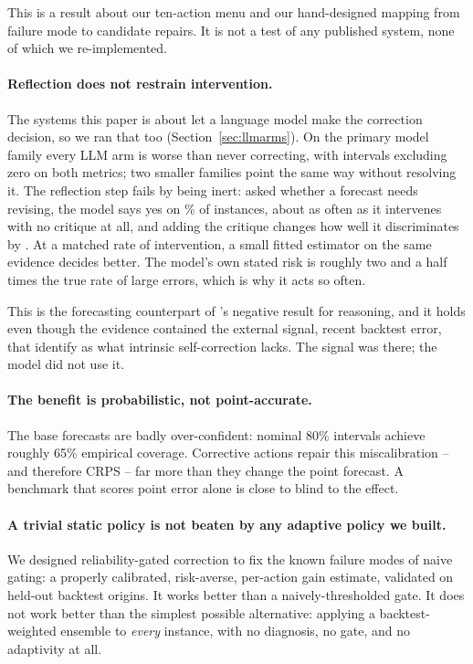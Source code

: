 This is a result about our ten-action menu and our hand-designed mapping from failure
mode to candidate repairs. It is not a test of any published system, none of which we
re-implemented.

\paragraph{Reflection does not restrain intervention.}
The systems this paper is about let a language model make the correction decision, so
we ran that too (Section~\ref{sec:llmarms}). On the primary model family every LLM
arm is worse than never correcting, with intervals excluding zero on both metrics; two
smaller families point the same way without resolving it. The reflection step fails by
being inert: asked whether a forecast needs revising, the model says yes on
\rateLlmCritiqueGate\% of instances, about as often as it intervenes with no
critique at all, and adding the critique changes how well it discriminates by
\discrimAurocDelta{}. At a matched rate of intervention, a small fitted estimator on the
same evidence decides better. The model's own stated risk is roughly two and a half
times the true rate of large errors, which is why it acts so often.

This is the forecasting counterpart of \citeauthor{huang2024selfcorrect}'s negative
result for reasoning, and it holds even though the evidence contained the external
signal, recent backtest error, that \citet{kamoi2024selfcorrect} identify as what
intrinsic self-correction lacks. The signal was there; the model did not use it.

\paragraph{The benefit is probabilistic, not point-accurate.}
The base forecasts are badly over-confident: nominal 80\% intervals achieve roughly 65\%
empirical coverage. Corrective actions repair this miscalibration -- and therefore CRPS
-- far more than they change the point forecast. A benchmark that scores point error
alone is close to blind to the effect.

\paragraph{A trivial static policy is not beaten by any adaptive policy we built.}
We designed reliability-gated correction to fix the known failure modes of naive
gating: a properly calibrated, risk-averse, per-action gain estimate, validated on
held-out backtest origins. It works better than a naively-thresholded gate. It does not
work better than the simplest possible alternative: applying a backtest-weighted
ensemble to \emph{every} instance, with no diagnosis, no gate, and no adaptivity at all.


